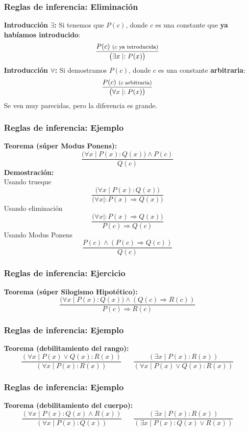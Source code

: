 \documentclass{beamer}
\newcommand{\then}{\Rightarrow}
\begin{document}
\begin{frame}[fragile]
    \frametitle{Reglas de inferencia: Eliminación}
    \textbf{Introducción $\exists$:} Si tenemos que $P(c)$, donde $c$ es una constante que \textbf{ya habíamos introducido}:
    $$\frac {P(c)\ \text{\footnotesize($c$ ya introducida)}}{\big(\exists x \mid : P(x)\big)} $$
    \textbf{Introducción $\forall$:} Si demostramos $P(c)$, donde $c$ es una constante \textbf{arbitraria}: 
        $$\frac{P(c)\ \text{\footnotesize($c$ arbitraria)}}{\big(\forall x \mid : P(x)\big)}$$
    Se ven muy parecidas, pero la diferencia es grande.
\end{frame}

\begin{frame}[fragile]
    \frametitle{Reglas de inferencia: Ejemplo}
    \textbf{Teorema (súper Modus Ponens):}
    $$\frac{\big(\forall x \mid P(x): Q(x)\big) \land P(c)}{Q(c)}$$
    \textbf{Demostración:} \\
    Usando trueque
    $$\frac{\big(\forall x \mid P(x): Q(x)\big)}{\big(\forall x \mid : P(x) \then Q(x)\big)}$$
    Usando eliminación 
    $$\frac{\big(\forall x \mid : P(x) \then Q(x)\big)}{P(c) \then Q(c)}$$
    Usando Modus Ponens
    $$\frac{P(c)\land (P(c) \then Q(c))}{Q(c)}$$
\end{frame}

\begin{frame}[fragile]
    \frametitle{Reglas de inferencia: Ejercicio}
    \textbf{Teorema (súper Silogismo Hipotético):}
    $$\frac{\big(\forall x \mid P(x): Q(x)\big) \land (Q(c) \then R(c))}{P(c) \then R(c)}$$
    \vspace{160pt}
\end{frame}

\begin{frame}[fragile]
    \frametitle{Reglas de inferencia: Ejemplo}
    \textbf{Teorema (debilitamiento del rango):}
    $$\frac{(\forall x \mid P(x) \lor Q(x): R(x))}{(\forall x \mid P(x): R(x))} \hspace{20pt} \frac{(\exists x \mid P(x): R(x))}{(\forall x \mid P(x) \lor Q(x): R(x))}$$
    \vspace{160pt}
\end{frame}

\begin{frame}[fragile]
    \frametitle{Reglas de inferencia: Ejemplo}
    \textbf{Teorema (debilitamiento del cuerpo):}
    $$\frac{(\forall x \mid P(x) : Q(x) \land R(x))}{(\forall x \mid P(x): Q(x))} \hspace{20pt} \frac{(\exists x \mid P(x): R(x))}{(\exists x \mid P(x) : Q(x) \lor R(x))}$$
    \vspace*{165 pt}
\end{frame}
\end{document}

